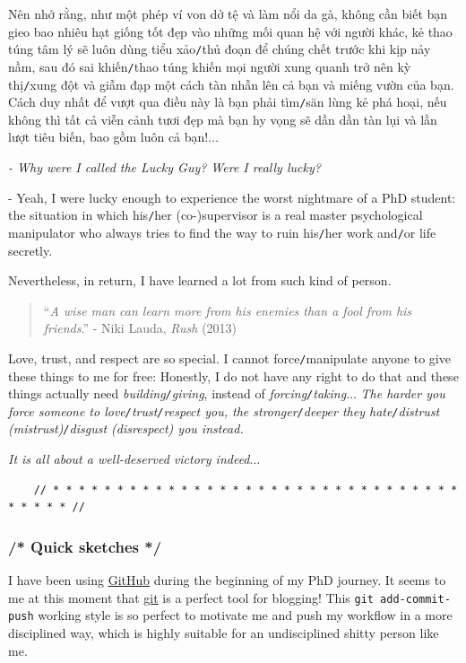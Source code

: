 \documentclass[12pt]{article}
\begin{document}
Nên nhớ rằng, như một phép ví von dở tệ và làm nổi da gà, không cần biết bạn gieo bao nhiêu hạt giống tốt đẹp vào những mối quan hệ với người khác, kẻ thao túng tâm lý sẽ luôn dùng tiểu xảo{\tt/}thủ đoạn để chúng chết trước khi kịp nảy nầm, sau đó sai khiến{\tt/}thao túng khiến mọi người xung quanh trở nên kỳ thị{\tt/}xung đột và giẫm đạp một cách tàn nhẫn lên cả bạn và miếng vườn của bạn. Cách duy nhất để vượt qua điều này là bạn phải tìm{\tt/}săn lùng kẻ phá hoại, nếu không thì tất cả viễn cảnh tươi đẹp mà bạn hy vọng sẽ dần dần tàn lụi và lần lượt tiêu biến, bao gồm luôn cả bạn!$\ldots$

{\it - Why were I called the Lucky Guy? Were I really lucky?}

- Yeah, I were lucky enough to experience the worst nightmare of a PhD student: the situation in which his{\tt/}her (co-)supervisor is a real master psychological manipulator who always tries to find the way to ruin his{\tt/}her work and{\tt/}or life secretly.

Nevertheless, in return, I have learned a lot from such kind of person.

\begin{quotation}
	``{\it A wise man can learn more from his enemies than a fool from his friends}.'' - Niki Lauda, {\it Rush} (2013)
\end{quotation}
Love, trust, and respect are so special. I cannot force{\tt/}manipulate anyone to give these things to me for free: Honestly, I do not have any right to do that and these things actually need {\it building{\tt/}giving}, instead of {\it forcing{\tt/}taking}$\ldots$ {\it The harder you force someone to love{\tt/}trust{\tt/}respect you, the stronger{\tt/}deeper they hate{\tt/}distrust (mistrust){\tt/}disgust (disrespect) you instead.}

{\it It is all about a well-deserved victory indeed}$\ldots$

\begin{verbatim}
	// * * * * * * * * * * * * * * * * * * * * * * * * * * * * * * * * * * * * * //
\end{verbatim}

\subsubsection{{\color{gray}/* Quick sketches */}}
 I have been using \href{https://github.com}{GitHub} during the beginning of my PhD journey. It seems to me at this moment that \href{https://git-scm.com/}{git} is a perfect tool for blogging! This \texttt{git add-commit-push} working style is so perfect to motivate me and push my workflow in a more disciplined way, which is highly suitable for an undisciplined shitty person like me.
\end{document}
